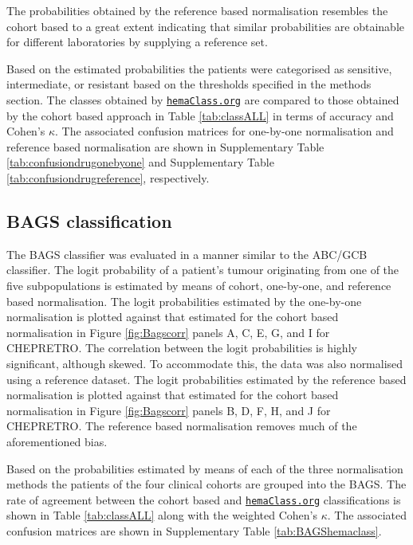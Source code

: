 \documentclass{article}
\newcommand{\hemaClass}{\href{http://hemaClass.org}{\texttt{hemaClass.org}}}
\begin{document}
The probabilities obtained by the reference based normalisation resembles the cohort based to a great extent indicating that similar probabilities are obtainable for different laboratories by supplying a reference set.

Based on the estimated probabilities the patients were categorised as sensitive, intermediate, or resistant based on the thresholds specified in the methods section.
The classes obtained by \hemaClass{} are compared to those obtained by the cohort based approach in Table \ref{tab:classALL} in terms of accuracy and Cohen's $\kappa$.
The associated confusion matrices for one-by-one normalisation and reference based normalisation are shown in Supplementary Table \ref{tab:confusiondrugonebyone} and Supplementary Table \ref{tab:confusiondrugreference}, respectively.

\subsection{BAGS classification}

The BAGS classifier was evaluated in a manner similar to the ABC/GCB classifier.
The logit probability of a patient's tumour originating from one of the five subpopulations is estimated by means of cohort, one-by-one, and reference based normalisation.
The logit probabilities estimated by the one-by-one normalisation is plotted against that estimated for the cohort based normalisation in Figure \ref{fig:Bagscorr} panels A, C, E, G, and I for CHEPRETRO.
The correlation between the logit probabilities is highly significant, although skewed.
To accommodate this, the data was also normalised using a reference dataset.
The logit probabilities estimated by the reference based normalisation is plotted against that estimated for the cohort based normalisation in Figure \ref{fig:Bagscorr} panels B, D, F, H, and J for CHEPRETRO.
The reference based normalisation removes much of the aforementioned bias.

Based on the probabilities estimated by means of each of the three normalisation methods the patients of the four clinical cohorts are grouped into the BAGS.
The rate of agreement between the cohort based and \hemaClass{} classifications is shown in Table \ref{tab:classALL} along with the weighted Cohen's $\kappa$.
The associated confusion matrices are shown in Supplementary Table \ref{tab:BAGShemaclass}.
\end{document}
